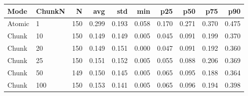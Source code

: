 \normalsize
\setlength{\tabcolsep}{3pt}
\begin{tabular}{llrrrrrrrr}
\toprule
Mode & ChunkN & N & avg & std & min & p25 & p50 & p75 & p90 \\
\midrule
Atomic & 1 & 150 & 0.299 & 0.193 & 0.058 & 0.170 & 0.271 & 0.370 & 0.475 \\
Chunk & 10 & 150 & 0.149 & 0.149 & 0.005 & 0.045 & 0.091 & 0.199 & 0.370 \\
Chunk & 20 & 150 & 0.149 & 0.151 & 0.000 & 0.047 & 0.091 & 0.192 & 0.360 \\
Chunk & 25 & 150 & 0.151 & 0.152 & 0.005 & 0.055 & 0.088 & 0.206 & 0.369 \\
Chunk & 50 & 149 & 0.150 & 0.145 & 0.005 & 0.065 & 0.095 & 0.188 & 0.364 \\
Chunk & 100 & 150 & 0.153 & 0.141 & 0.005 & 0.065 & 0.096 & 0.194 & 0.398 \\
\bottomrule
\end{tabular}
